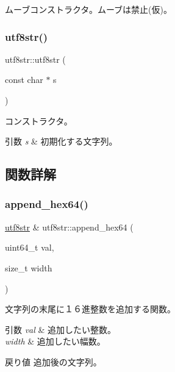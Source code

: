 ムーブコンストラクタ。ムーブは禁止(仮)。 \hypertarget{classutf8str_a9fde6a70538271f4a9224155d31424c5}{}\label{classutf8str_a9fde6a70538271f4a9224155d31424c5} 
\subsubsection{\texorpdfstring{utf8str()}{utf8str()}\hspace{0.1cm}{\footnotesize\ttfamily [4/4]}}
{\footnotesize\ttfamily utf8str\+::utf8str (\begin{DoxyParamCaption}\item[{const char $\ast$}]{s }\end{DoxyParamCaption})}

コンストラクタ。 
\begin{DoxyParams}{引数}
{\em s} & 初期化する文字列。 \\
\hline
\end{DoxyParams}


\subsection{関数詳解}
\hypertarget{classutf8str_a33d69e7615a354019452458a3bfdc6ef}{}\label{classutf8str_a33d69e7615a354019452458a3bfdc6ef} 
\subsubsection{\texorpdfstring{append\+\_\+hex64()}{append\_hex64()}}
{\footnotesize\ttfamily \hyperlink{classutf8str}{utf8str} \& utf8str\+::append\+\_\+hex64 (\begin{DoxyParamCaption}\item[{uint64\+\_\+t}]{val,  }\item[{size\+\_\+t}]{width }\end{DoxyParamCaption})}

文字列の末尾に１６進整数を追加する関数。 
\begin{DoxyParams}{引数}
{\em val} & 追加したい整数。 \\
\hline
{\em width} & 追加したい幅数。 \\
\hline
\end{DoxyParams}
\begin{DoxyReturn}{戻り値}
追加後の文字列。 
\end{DoxyReturn}
\hypertarget{classutf8str_ae978ea3d847dafc5144d526ab280e41b}{}\label{classutf8str_ae978ea3d847dafc5144d526ab280e41b} 
